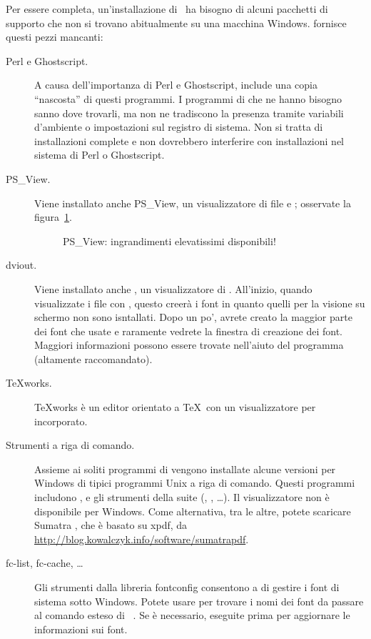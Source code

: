\documentclass{article}
\begin{document}
Per essere completa, un'installazione di \TL\ ha bisogno di alcuni
pacchetti di supporto che non si trovano abitualmente su una macchina
Windows. \TL{} fornisce questi pezzi mancanti:
\begin{description}
\item[Perl e Ghostscript.] A causa dell'importanza di Perl e Ghostscript,
  \TL{} include una copia ``nascosta'' di questi programmi. I programmi di
  \TL{} che ne hanno bisogno sanno dove trovarli, ma non ne tradiscono la
  presenza tramite variabili d'ambiente o impostazioni sul registro di
  sistema. Non si tratta di installazioni complete e non dovrebbero
  interferire con installazioni nel sistema di Perl o Ghostscript.

\item[PS\_View.] Viene installato anche PS\_View, un visualizzatore di
  file \PS{} e ; osservate la figura~\ref{fig:psview}.

\begin{figure}[tb]
\caption{PS\_View: ingrandimenti elevatissimi disponibili!}
\label{fig:psview}
\end{figure}

\item[dviout.] Viene installato anche , un visualizzatore di
  . All'inizio, quando visualizzate i file con ,
  questo creerà i font in quanto quelli per la visione su schermo non sono
  isntallati. Dopo un po', avrete creato la maggior parte dei font che
  usate e raramente vedrete la finestra di creazione dei font. Maggiori
  informazioni possono essere trovate nell'aiuto del programma (altamente
  raccomandato).

\item[\TeX{}works.] \TeX{}works è un editor orientato a \TeX\ con un
  visualizzatore per  incorporato.

\item[Strumenti a riga di comando.] Assieme ai soliti programmi di \TL{}
  vengono installate alcune versioni per Windows di tipici programmi Unix
  a riga di comando. Questi programmi includono ,
   e gli strumenti della suite 
  (, , \ldots). Il visualizzatore
   non è disponibile per Windows. Come alternativa, tra le
  altre, potete scaricare Sumatra , che è basato su xpdf, da
  \url{http://blog.kowalczyk.info/software/sumatrapdf}.

\item[fc-list, fc-cache, \ldots] Gli strumenti dalla libreria fontconfig
  consentono a \XeTeX{} di gestire i font di sistema sotto Windows. Potete
  usare  per trovare i nomi dei font da passare al comando
  esteso di \XeTeX\ . Se è necessario, eseguite prima
   per aggiornare le informazioni sui font.

\end{description}
\end{document}
